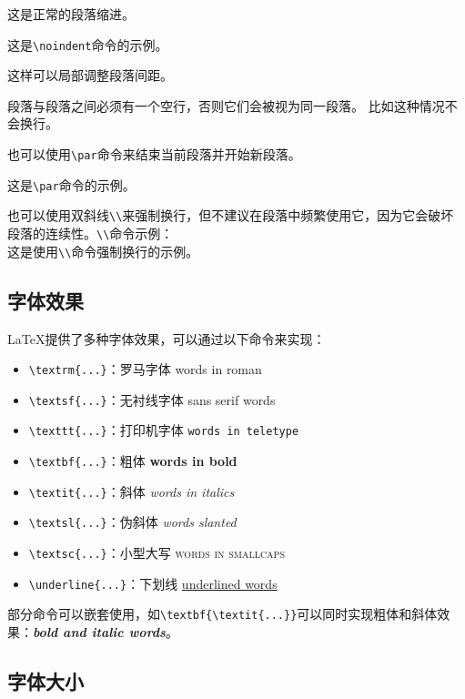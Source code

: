 \documentclass[12pt, a4paper, oneside]{ctexart}
\begin{document}
这是正常的段落缩进。

\noindent
这是\verb|\noindent|命令的示例。

\vspace{2em}
这样可以局部调整段落间距。

段落与段落之间必须有一个空行，否则它们会被视为同一段落。
比如这种情况不会换行。

也可以使用\verb|\par|命令来结束当前段落并开始新段落。\par
这是\verb|\par|命令的示例。

也可以使用双斜线\verb|\\|来强制换行，但不建议在段落中频繁使用它，因为它会破坏段落的连续性。\verb|\\|命令示例：\\
这是使用\verb|\\|命令强制换行的示例。

\subsection{字体效果}
LaTeX提供了多种字体效果，可以通过以下命令来实现：
\begin{itemize}
    \item \verb|\textrm{...}|：罗马字体 \textrm{words in roman}
    \item \verb|\textsf{...}|：无衬线字体 \textsf{sans serif words}
    \item \verb|\texttt{...}|：打印机字体 \texttt{words in teletype}
    \item \verb|\textbf{...}|：粗体 \textbf{words in bold}
    \item \verb|\textit{...}|：斜体 \textit{words in italics}
    \item \verb|\textsl{...}|：伪斜体 \textsl{words slanted}
    \item \verb|\textsc{...}|：小型大写 \textsc{words in smallcaps}
    \item \verb|\underline{...}|：下划线 \underline{underlined words}
\end{itemize}

部分命令可以嵌套使用，如\verb|\textbf{\textit{...}}|可以同时实现粗体和斜体效果：\textbf{\textit{bold and italic words}}。

\subsection{字体大小}
\end{document}
